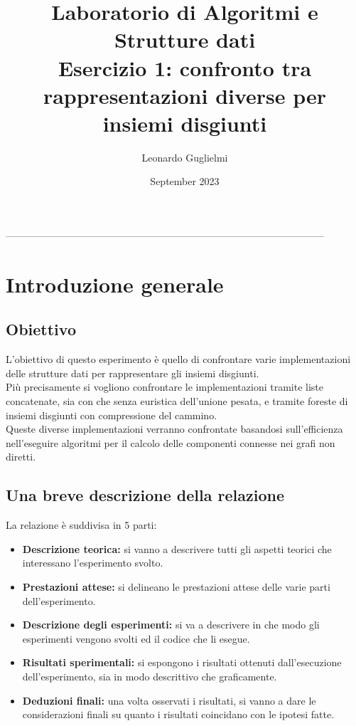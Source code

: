 \documentclass[12pt]{article}
\title{\textbf{Laboratorio di Algoritmi e Strutture dati}\\ Esercizio 1: confronto tra rappresentazioni diverse per insiemi disgiunti}
\author{Leonardo Guglielmi}
\date{September 2023}
\begin{document}
\maketitle
\tableofcontents
------------------------------------------------------------------------------------------------
\section{Introduzione generale}

\subsection{Obiettivo}
L'obiettivo di questo esperimento è quello di confrontare varie implementazioni delle strutture dati per rappresentare gli insiemi disgiunti.\\
Più precisamente si vogliono confrontare le implementazioni tramite liste concatenate, sia con che senza euristica dell'unione pesata, e tramite foreste di insiemi disgiunti con compressione del cammino.\\
Queste diverse implementazioni verranno confrontate basandosi sull'efficienza nell'eseguire algoritmi per il calcolo delle componenti connesse nei grafi non diretti.

\subsection{Una breve descrizione della relazione}
La relazione è suddivisa in 5 parti:
\begin{itemize}
    \item \textbf{Descrizione teorica:} si vanno a descrivere tutti gli aspetti teorici che interessano l'esperimento svolto.

    \item \textbf{Prestazioni attese:} si delineano le prestazioni attese delle varie parti dell'esperimento.

    \item \textbf{Descrizione degli esperimenti:} si va a descrivere in che modo gli esperimenti vengono svolti ed il codice che li esegue.

    \item \textbf{Risultati sperimentali:} si espongono i risultati ottenuti dall'esecuzione dell'esperimento, sia in modo descrittivo che graficamente.

    \item \textbf{Deduzioni finali:} una volta osservati i risultati, si vanno a dare le considerazioni finali su quanto i risultati coincidano con le ipotesi fatte.
\end{itemize}
\end{document}
